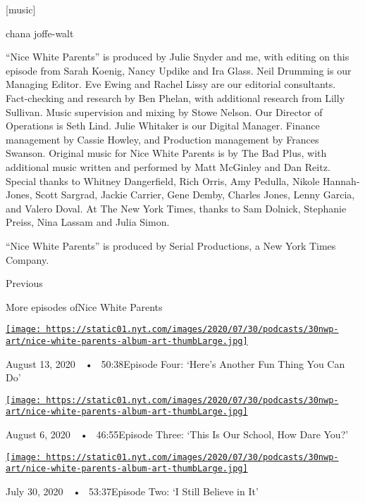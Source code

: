 {[}music{]}

chana joffe-walt

``Nice White Parents'' is produced by Julie Snyder and me, with editing
on this episode from Sarah Koenig, Nancy Updike and Ira Glass. Neil
Drumming is our Managing Editor. Eve Ewing and Rachel Lissy are our
editorial consultants. Fact-checking and research by Ben Phelan, with
additional research from Lilly Sullivan. Music supervision and mixing by
Stowe Nelson. Our Director of Operations is Seth Lind. Julie Whitaker is
our Digital Manager. Finance management by Cassie Howley, and Production
management by Frances Swanson. Original music for Nice White Parents is
by The Bad Plus, with additional music written and performed by Matt
McGinley and Dan Reitz. Special thanks to Whitney Dangerfield, Rich
Orris, Amy Pedulla, Nikole Hannah-Jones, Scott Sargrad, Jackie Carrier,
Gene Demby, Charles Jones, Lenny Garcia, and Valero Doval. At The New
York Times, thanks to Sam Dolnick, Stephanie Preiss, Nina Lassam and
Julia Simon.

``Nice White Parents'' is produced by Serial Productions, a New York
Times Company.

Previous

More episodes ofNice White Parents

\href{https://www.nytimes.com/2020/08/13/podcasts/nice-white-parents-school.html?action=click\&module=audio-series-bar\&region=header\&pgtype=Article}{\texttt{[image: https://static01.nyt.com/images/2020/07/30/podcasts/30nwp-art/nice-white-parents-album-art-thumbLarge.jpg]}}

August 13, 2020~~•~ 50:38Episode Four: `Here's Another Fun Thing You Can
Do'

\href{https://www.nytimes.com/2020/08/06/podcasts/episode-three-this-is-our-school-how-dare-you.html?action=click\&module=audio-series-bar\&region=header\&pgtype=Article}{\texttt{[image: https://static01.nyt.com/images/2020/07/30/podcasts/30nwp-art/nice-white-parents-album-art-thumbLarge.jpg]}}

August 6, 2020~~•~ 46:55Episode Three: `This Is Our School, How Dare
You?'

\href{https://www.nytimes.com/2020/07/30/podcasts/nice-white-parents-serial-2.html?action=click\&module=audio-series-bar\&region=header\&pgtype=Article}{\texttt{[image: https://static01.nyt.com/images/2020/07/30/podcasts/30nwp-art/nice-white-parents-album-art-thumbLarge.jpg]}}

July 30, 2020~~•~ 53:37Episode Two: `I Still Believe in It'

